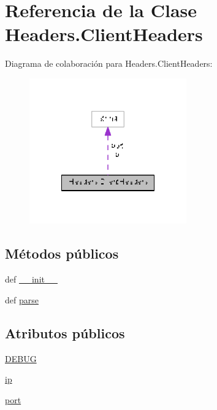 \hypertarget{class_headers_1_1_client_headers}{\section{Referencia de la Clase Headers.\-Client\-Headers}
\label{class_headers_1_1_client_headers}
}


Diagrama de colaboración para Headers.\-Client\-Headers\-:\nopagebreak
\begin{figure}[H]
\begin{center}
\leavevmode
\includegraphics[width=192pt]{class_headers_1_1_client_headers__coll__graph}
\end{center}
\end{figure}
\subsection*{Métodos públicos}
\begin{DoxyCompactItemize}
\item 
def \hyperlink{class_headers_1_1_client_headers_a7dfc5b4ba33e104c0c4c320273583f06}{\-\_\-\-\_\-init\-\_\-\-\_\-}
\item 
def \hyperlink{class_headers_1_1_client_headers_a7ee0d7e2c47c1c9810e8427116479f3d}{parse}
\end{DoxyCompactItemize}
\subsection*{Atributos públicos}
\begin{DoxyCompactItemize}
\item 
\hyperlink{class_headers_1_1_client_headers_ad6a52ab3ffc9bdb7a023e8b42ce7083a}{D\-E\-B\-U\-G}
\item 
\hyperlink{class_headers_1_1_client_headers_a3b830916eb5f486466733a631debd80f}{ip}
\item 
\hyperlink{class_headers_1_1_client_headers_af5c53154eabf8999c0445d47c2ec2e93}{port}
\end{DoxyCompactItemize}
